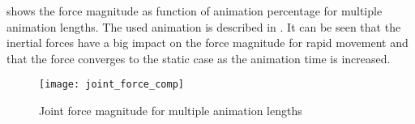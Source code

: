  shows the force magnitude as function of animation percentage for multiple animation lengths. The used animation is described in . It can be seen that the inertial forces have a big impact on the force magnitude for rapid movement and that the force converges to the static case as the animation time is increased.


\begin{figure}[h!]
    \centering
    \texttt{[image: joint\_force\_comp]}
    \caption{Joint force magnitude for multiple animation lengths}
    \label{results}
\end{figure}